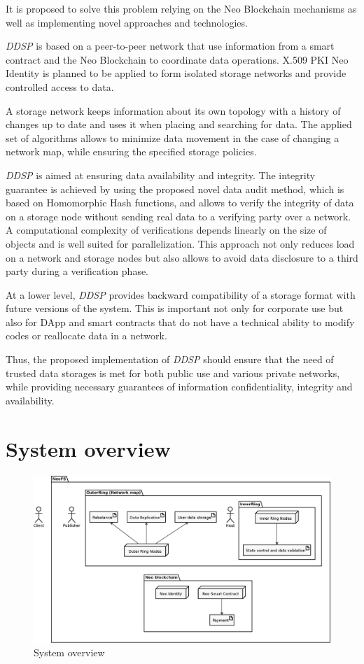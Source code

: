 \documentclass[a4paper, 11pt]{article}
\begin{document}
It is proposed to solve this problem relying on the Neo Blockchain mechanisms
as well as implementing novel approaches and technologies.

\textit{DDSP} is based on a peer-to-peer network that
use information from a smart contract and the Neo Blockchain to coordinate data
operations. X.509 PKI Neo Identity is planned to be applied to form isolated
storage networks and provide controlled access to data.

A storage network keeps information about its own topology with a
history of changes up to date and uses it when placing and searching for
data. The applied set of algorithms allows to minimize data movement
in the case of changing a network map, while ensuring the
specified storage policies.

\textit{DDSP} is aimed at ensuring data availability and
integrity. The integrity guarantee is achieved by using the proposed
novel data audit method, which is based on Homomorphic Hash functions, and
allows to verify the integrity of data on a storage node without sending real
data to a verifying party over a network. A computational complexity of
verifications depends linearly on the size of objects and is well suited for
parallelization. This approach not only reduces load on a network and storage
nodes but also allows to avoid data disclosure to a third party during a verification phase.

At a lower level, \textit{DDSP} provides backward
compatibility of a storage format with future versions of the system. This is
important not only for corporate use but also for DApp and smart contracts that
do not have a technical ability to modify codes or reallocate data in a network.

Thus, the proposed implementation of \textit{DDSP}
should ensure that the need of trusted data storages is met for both public use
and various private networks, while providing necessary guarantees of
information confidentiality, integrity and availability.

\section{System overview}

\begin{figure}[h]
\centering
\includegraphics[scale=.55]{pic/overview1.eps}
\caption{System overview} 
\end{figure}
\end{document}
